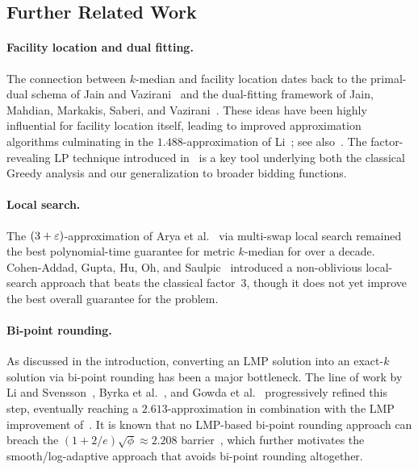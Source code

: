 \subsection{Further Related Work}

\paragraph{Facility location and dual fitting.}
The connection between $k$-median and facility location dates back to the primal-dual schema of Jain and Vazirani~\cite{JaV01} and the dual-fitting framework of Jain, Mahdian, Markakis, Saberi, and Vazirani~\cite{JMS02,JainMMSV03}. These ideas have been highly influential for facility location itself, leading to improved approximation algorithms culminating in the $1.488$-approximation of Li~\cite{Li13}; see also~\cite{CharikarGTS99,ChudakS03, ByrkaA10}. The factor-revealing LP technique introduced in~\cite{JainMMSV03} is a key tool underlying both the classical Greedy analysis and our generalization to broader bidding functions.

\paragraph{Local search.}
The $(3+\varepsilon)$-approximation of Arya et al.~\cite{AryaGKMMP04} via multi-swap local search remained the best polynomial-time guarantee for metric $k$-median for over a decade. Cohen-Addad, Gupta, Hu, Oh, and Saulpic~\cite{Cohen-AddadGHOS22} introduced a non-oblivious local-search approach that beats the classical factor~$3$, though it does not yet improve the best overall guarantee for the problem.

\paragraph{Bi-point rounding.}
As discussed in the introduction, converting an LMP solution into an exact-$k$ solution via bi-point rounding has been a major bottleneck. The line of work by Li and Svensson~\cite{LiS16}, Byrka et al.~\cite{ByrkaPRST17}, and Gowda et al.~\cite{GowdaPST23} progressively refined this step, eventually reaching a $2.613$-approximation in combination with the LMP improvement of~\cite{Cohen-AddadLS23}. It is known that no LMP-based bi-point rounding approach can breach the $(1+2/e)\sqrt{\phi} \approx 2.208$ barrier~\cite{GowdaPST23}, which further motivates the smooth/log-adaptive approach that avoids bi-point rounding altogether.

